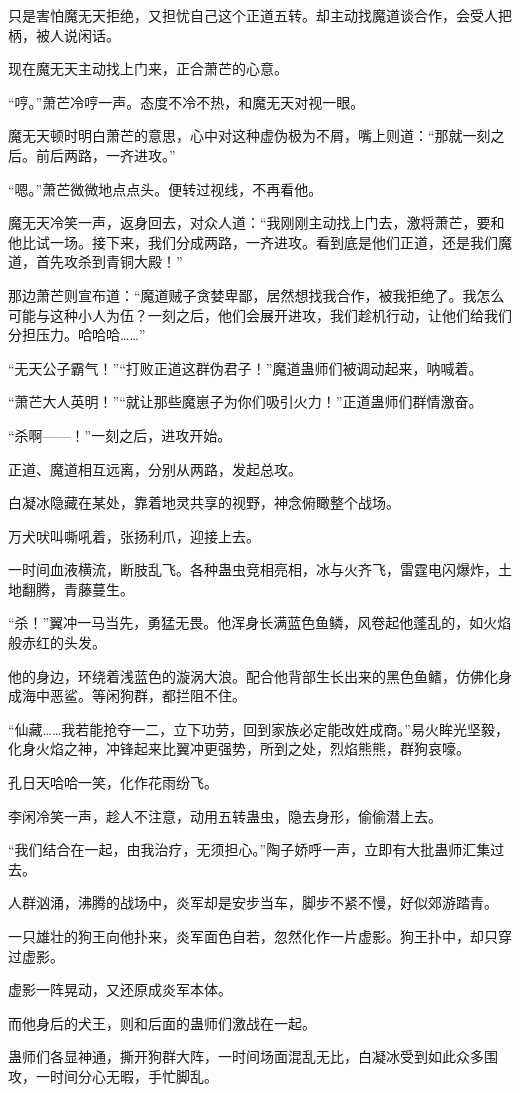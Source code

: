 \begin{this_body}
只是害怕魔无天拒绝，又担忧自己这个正道五转。却主动找魔道谈合作，会受人把柄，被人说闲话。

现在魔无天主动找上门来，正合萧芒的心意。

“哼。”萧芒冷哼一声。态度不冷不热，和魔无天对视一眼。

魔无天顿时明白萧芒的意思，心中对这种虚伪极为不屑，嘴上则道：“那就一刻之后。前后两路，一齐进攻。”

“嗯。”萧芒微微地点点头。便转过视线，不再看他。

魔无天冷笑一声，返身回去，对众人道：“我刚刚主动找上门去，激将萧芒，要和他比试一场。接下来，我们分成两路，一齐进攻。看到底是他们正道，还是我们魔道，首先攻杀到青铜大殿！”

那边萧芒则宣布道：“魔道贼子贪婪卑鄙，居然想找我合作，被我拒绝了。我怎么可能与这种小人为伍？一刻之后，他们会展开进攻，我们趁机行动，让他们给我们分担压力。哈哈哈……”

“无天公子霸气！”“打败正道这群伪君子！”魔道蛊师们被调动起来，呐喊着。

“萧芒大人英明！”“就让那些魔崽子为你们吸引火力！”正道蛊师们群情激奋。

“杀啊——！”一刻之后，进攻开始。

正道、魔道相互远离，分别从两路，发起总攻。

白凝冰隐藏在某处，靠着地灵共享的视野，神念俯瞰整个战场。

万犬吠叫嘶吼着，张扬利爪，迎接上去。

一时间血液横流，断肢乱飞。各种蛊虫竞相亮相，冰与火齐飞，雷霆电闪爆炸，土地翻腾，青藤蔓生。

“杀！”翼冲一马当先，勇猛无畏。他浑身长满蓝色鱼鳞，风卷起他蓬乱的，如火焰般赤红的头发。

他的身边，环绕着浅蓝色的漩涡大浪。配合他背部生长出来的黑色鱼鳍，仿佛化身成海中恶鲨。等闲狗群，都拦阻不住。

“仙藏……我若能抢夺一二，立下功劳，回到家族必定能改姓成商。”易火眸光坚毅，化身火焰之神，冲锋起来比翼冲更强势，所到之处，烈焰熊熊，群狗哀嚎。

孔日天哈哈一笑，化作花雨纷飞。

李闲冷笑一声，趁人不注意，动用五转蛊虫，隐去身形，偷偷潜上去。

“我们结合在一起，由我治疗，无须担心。”陶子娇呼一声，立即有大批蛊师汇集过去。

人群汹涌，沸腾的战场中，炎军却是安步当车，脚步不紧不慢，好似郊游踏青。

一只雄壮的狗王向他扑来，炎军面色自若，忽然化作一片虚影。狗王扑中，却只穿过虚影。

虚影一阵晃动，又还原成炎军本体。

而他身后的犬王，则和后面的蛊师们激战在一起。

蛊师们各显神通，撕开狗群大阵，一时间场面混乱无比，白凝冰受到如此众多围攻，一时间分心无暇，手忙脚乱。

\end{this_body}

